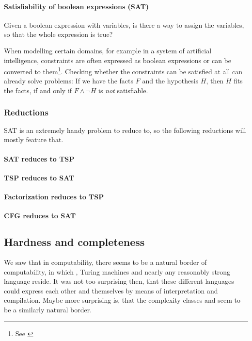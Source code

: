 \paragraph{Satisfiability of boolean expressions (SAT)}
Given a boolean expression with variables, is there a way to assign the 
variables, so that the whole expression is true?
\begin{example}[Relevance]
	When modelling certain domains, for example in a system of artificial
	intelligence, constraints are often expressed as boolean expressions or can
	be converted to them\footnote{See \cite{russell1995artificial}}. Checking
	whether the constraints can be satisfied at all can already solve problems:
	If we have the facts $F$ and the hypothesis $H$, then $H$ fits the facts, if
	and only if $F\wedge\lnot H$ is \emph{not} satisfiable.
\end{example}
\subsubsection{Reductions}
SAT is an extremely handy problem to reduce to, so the following reductions 
will mostly feature that.
\paragraph{SAT reduces to TSP}
\TODO
\paragraph{TSP reduces to SAT}
\TODO
\paragraph{Factorization reduces to TSP}
\TODO

\paragraph{CFG reduces to SAT}
\TODO

\subsection{Hardness and completeness}
We saw that in computability, there seems to be a natural border of 
computability, in which \WHILE, Turing machines and nearly any reasonably 
strong language reside. It was not too surprising then, that these different 
languages could express each other and themselves by means of interpretation and
compilation. Maybe more surprising is, that the complexity classes \PTIME and 
\NPTIME seem to be a similarly natural border.

